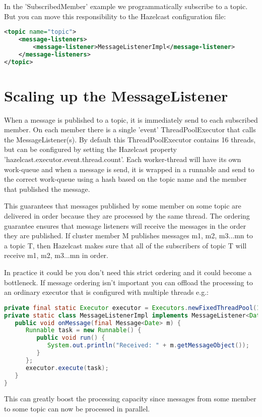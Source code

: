 In the 'SubscribedMember' example we programmatically subscribe to a topic. But you can move this responsibility to the  Hazelcast configuration file:
\begin{lstlisting}[language=xml]
<topic name="topic">
    <message-listeners>
        <message-listener>MessageListenerImpl</message-listener>
    </message-listeners>
</topic>
\end{lstlisting}

\section{Scaling up the MessageListener}
When a message is published to a topic, it is immediately send to each subscribed member. On each member there is a single 'event' ThreadPoolExecutor that calls the MessageListener(s). By default this ThreadPoolExecutor contains 16 threads, but can be configured by setting the Hazelcast property 'hazelcast.executor.event.thread.count'. Each worker-thread will have its own work-queue and when a message is send, it is wrapped in a runnable and send to the correct work-queue using a hash based on the topic name and the member that published the message.

This guarantees that messages published by some member on some topic are delivered in order because they are processed by the same thread. The ordering guarantee ensures that message listeners will receive the messages in the order they are published. If cluster member M publishes messages m1, m2, m3...mn to a topic T, then Hazelcast makes sure that all of the subscribers of topic T will receive m1, m2, m3...mn in order. 

In practice it could be you don't need this strict ordering and it could become a bottleneck. If message ordering isn't important you can offload the processing to an ordinary executor that is configured with multiple threads e.g.:
\begin{lstlisting}[language=java]
private final static Executor executor = Executors.newFixedThreadPool(10);       
private static class MessageListenerImpl implements MessageListener<Date> {
   public void onMessage(final Message<Date> m) {
      Runnable task = new Runnable() {
         public void run() {
            System.out.println("Received: " + m.getMessageObject());
         }
      };
      executor.execute(task);
   }
} 
\end{lstlisting}
This can greatly boost the processing capacity since messages from some member to some topic can now be processed in parallel.

